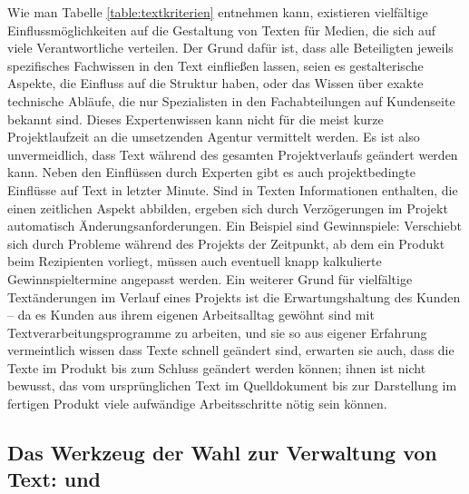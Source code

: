 Wie man Tabelle \ref{table:textkriterien} entnehmen kann, existieren vielfältige Einflussmöglichkeiten auf die Gestaltung von Texten für Medien, die sich auf viele Verantwortliche verteilen. Der Grund dafür ist, dass alle Beteiligten jeweils spezifisches Fachwissen in den Text einfließen lassen, seien es gestalterische Aspekte, die Einfluss auf die Struktur haben, oder das Wissen über exakte technische Abläufe, die nur Spezialisten in den Fachabteilungen auf Kundenseite bekannt sind. Dieses Expertenwissen kann nicht für die meist kurze Projektlaufzeit an die umsetzenden Agentur vermittelt werden. Es ist also unvermeidlich, dass Text während des gesamten Projektverlaufs geändert werden kann. Neben den Einflüssen durch Experten gibt es auch projektbedingte Einflüsse auf Text in letzter Minute. Sind in Texten Informationen enthalten, die einen zeitlichen Aspekt abbilden, ergeben sich durch Verzögerungen im Projekt automatisch Änderungsanforderungen. Ein Beispiel sind Gewinnspiele: Verschiebt sich durch Probleme während des Projekts der Zeitpunkt, ab dem ein Produkt beim Rezipienten vorliegt, müssen auch eventuell knapp kalkulierte Gewinnspieltermine angepasst werden. Ein weiterer Grund für vielfältige Textänderungen im Verlauf eines Projekts ist die Erwartungshaltung des Kunden -- da es Kunden aus ihrem eigenen Arbeitsalltag gewöhnt sind mit Textverarbeitungsprogramme zu arbeiten, und sie so aus eigener Erfahrung vermeintlich wissen dass Texte schnell geändert sind, erwarten sie auch, dass die Texte im Produkt bis zum Schluss geändert werden können; ihnen ist nicht bewusst, das vom ursprünglichen Text im Quelldokument bis zur Darstellung im fertigen Produkt viele aufwändige Arbeitsschritte nötig sein können.

\subsection{Das Werkzeug der Wahl zur Verwaltung von Text:  und }\label{l:werkzeugwahl}

